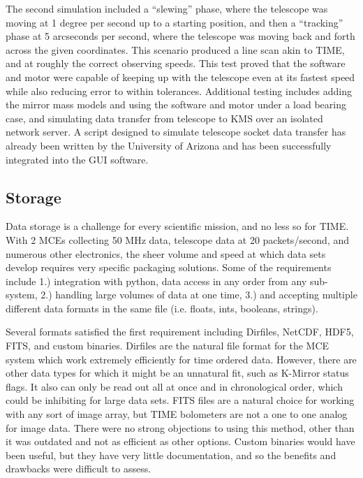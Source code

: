 \documentclass[manuscript]{aastex}
\begin{document}
The second simulation included a ``slewing'' phase, where the telescope was moving at 1 degree per second up to a starting position, and then a ``tracking'' phase at 5 arcseconds per second, where the telescope was moving back and forth across the given coordinates. This scenario produced a line scan akin to TIME, and at roughly the correct observing speeds. This test proved that the software and motor were capable of keeping up with the telescope even at its fastest speed while also reducing error to within tolerances.  Additional testing includes adding the mirror mass models and using the software and motor under a load bearing case, and simulating data transfer from telescope to KMS over an isolated network server. A script designed to simulate telescope socket data transfer has already been written by the University of Arizona and has been successfully integrated into the GUI software. 
\subsection{\textbf{Storage}}

Data storage is a challenge for every scientific mission, and no less so for TIME. With 2 MCEs collecting 50 MHz data, telescope data at 20 packets/second, and numerous other electronics, the sheer volume and speed at which data sets develop requires very specific packaging solutions. Some of the requirements include 1.) integration with python, data access in any order from any sub-system, 2.) handling large volumes of data at one time, 3.) and accepting multiple different data formats in the same file (i.e. floats, ints, booleans, strings). 

Several formats satisfied the first requirement including Dirfiles, NetCDF, HDF5, FITS, and custom binaries. Dirfiles are the natural file format for the MCE system which work extremely efficiently for time ordered data. However, there are other data types for which it might be an unnatural fit, such as K-Mirror status flags. It also can only be read out all at once and in chronological order, which could be inhibiting for large data sets. FITS files are a natural choice for working with any sort of image array, but TIME bolometers are not a one to one analog for image data. There were no strong objections to using this method, other than it was outdated and not as efficient as other options. Custom binaries would have been useful, but they have very little documentation, and so the benefits and drawbacks were difficult to assess. 
\end{document}
